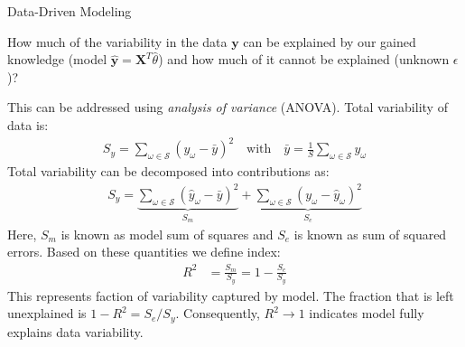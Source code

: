 \documentclass[9pt]{beamer}
\begin{document}
%
\begin{frame}{Data-Driven Modeling}

\begin{block}{}
How much of the variability in the data $\mathbf{y}$ can be explained by our gained knowledge (model $\hat{\mathbf{y}}=\mathbf{X}^T\hat{\theta}$) and how much of it cannot be explained (unknown $\epsilon$)?
\end{block}
This can be addressed using {\em analysis of variance} (ANOVA).  Total variability of data is:
\begin{align*}
S_{y}=\sum_{\omega\in \mathcal{S}}(y_\omega -\bar{{y}})^2\quad \textrm{with}
\quad \bar{{y}}=\frac{1}{S}\sum_{\omega \in \mathcal{S}}y_\omega 
\end{align*}
Total variability can be decomposed into contributions as:
\begin{align*}
S_{y}=\underbrace{\sum_{\omega\in \mathcal{S}}(\hat{y}_\omega -\bar{y})^2}_{S_m}+\underbrace{\sum_{\omega\in \mathcal{S}}(y_\omega -\hat{y}_\omega)^2}_{S_e}
\end{align*}
Here, $S_m$ is known as model sum of squares and $S_e$ is known as sum of squared errors.  Based on these quantities we define index: 
\begin{align*}
R^2&=\frac{S_m}{S_y}=1-\frac{S_e}{S_y}
\end{align*}
This represents faction of variability captured by model. The fraction that is left unexplained is $1-R^2={S_e}/{S_y}$.  Consequently, $R^2\to 1$ indicates model fully explains data variability. 
\end{frame}
\end{document}
